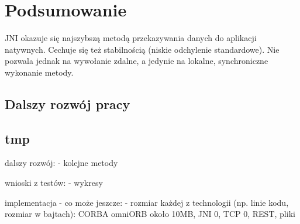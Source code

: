 \chapter{Podsumowanie}

JNI okazuje się najszybszą metodą przekazywania danych do aplikacji natywnych. Cechuje się też stabilnością (niskie odchylenie standardowe). Nie pozwala jednak na wywołanie zdalne, a jedynie na lokalne, synchroniczne wykonanie metody.


\section{Dalszy rozwój pracy}


\section{tmp}

dalszy rozwój:
- kolejne metody

wnioski z testów:
- wykresy

implementacja - co może jeszcze:
- rozmiar każdej z technologii (np. linie kodu, rozmiar w bajtach): CORBA omniORB około 10MB, JNI 0, TCP 0, REST, pliki
